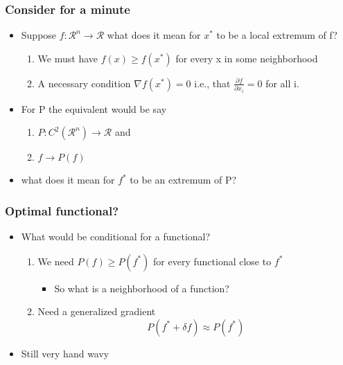 \documentclass[10pt]{beamer}
\begin{document}
\begin{frame}
  \frametitle{Consider for a minute}
  \begin{itemize}
  \item Suppose $ f: \mathcal{R}^n \rightarrow \mathcal{R}$ what does it mean for $x^*$ to be a local extremum of f? 
    \begin{enumerate}
    \item We must have $f(x) \geq f(x^*)$ for every x in some neighborhood
    \item A necessary condition $\nabla f(x^*) = 0$ i.e., that $\frac{\partial f}{\partial x_i} = 0$ for all i. 
    \end{enumerate}
  \item For P the equivalent would be say
    \begin{enumerate}
    \item $P: C^2(\mathcal{R}^n) \rightarrow \mathcal{R}$ and
    \item $f \rightarrow P(f)$
    \end{enumerate}
  \item what does it mean for $f^*$ to be an extremum of P?
  \end{itemize}
\end{frame}

\begin{frame}
  \frametitle{Optimal functional? }
  \begin{itemize}
  \item What would be conditional for a functional?
    \begin{enumerate}
    \item We need $P(f) \geq P(f^*)$ for every functional close to $f^*$
      \begin{itemize}
      \item So what is a neighborhood of a function?
      \end{itemize}
    \item Need a generalized gradient
      \[
        P( f^* + \delta f ) \approx P(f^*)
      \]
    \end{enumerate}
  \item Still very hand wavy
  \end{itemize}
\end{frame}
\end{document}
